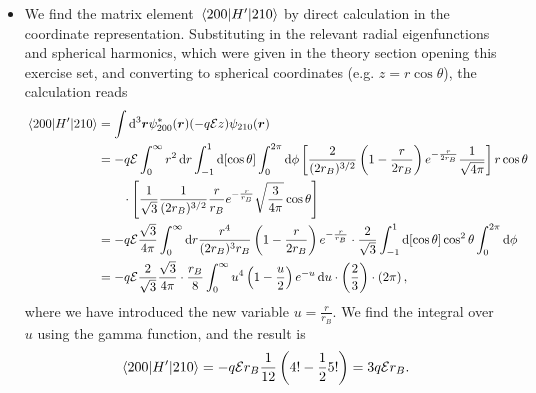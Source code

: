\documentclass[11pt, a4paper]{article}
\newcommand{\diff}{\mathop{}\!\mathrm{d}} %
\renewcommand{\vec}[1]{\bm{#1}} %
\renewcommand{\r}{\vec{r}}  %
\newcommand{\E}{\mathcal{E}}  %
\begin{document}
\begin{itemize}
	\item We find the matrix element $ \mel{200}{H'}{210} $ by direct calculation in the coordinate representation. Substituting in the relevant radial eigenfunctions and spherical harmonics, which were given in the theory section opening this exercise set, and converting to spherical coordinates (e.g. $ z = r\cos \theta $), the calculation reads
	\begin{align*}
		\mel{200}{H'}{210} &= \int \diff^{3}\vec{r} \psi_{200}^{*}(\r) (-q \E z)\psi_{210}(\r)\\
		& = -q\E\int_{0}^{\infty}r^{2} \diff r \int_{-1}^{1}\diff [\cos \theta] \int_{0}^{2\pi}\diff \phi\left[ \frac{2}{(2r_{B})^{3/2}}\left(1 - \frac{r}{2r_{B}}\right)e^{-\frac{r}{2r_{B}}}\frac{1}{\sqrt{4\pi}}\right] r\cos \theta \\
	 	& {} \qquad \cdot \left[\frac{1}{\sqrt{3}}\frac{1}{(2r_{B})^{3/2}} \frac{r}{r_{B}}e^{-\frac{r}{r_{B}}} \sqrt{\frac{3}{4\pi}} \cos \theta\right]\\
		& = - q \E \frac{\sqrt{3}}{4\pi}\int_{0}^{\infty}\diff r \frac{r^{4}}{(2r_{B})^{3} r_{B}}\left(1 - \frac{r}{2r_{B}}\right)e^{-\frac{r}{r_{B}}} \cdot \frac{2}{\sqrt{3}}\int_{-1}^{1}\diff [\cos \theta] \cos^{2}\theta \int_{0}^{2\pi} \diff \phi\\
		& = -q\E \frac{2}{\sqrt{3}}\frac{\sqrt{3}}{4\pi} \cdot \frac{r_{B}}{8} \int_{0}^{\infty} u^{4}\left(1 - \frac{u}{2}\right)e^{-u} \diff u \cdot \left(\frac{2}{3}\right) \cdot \left(2\pi\right),
	\end{align*}
	where we have introduced the new variable $ u = \frac{r}{r_{B}} $. We find the integral over $ u $ using the gamma function, and the result is
	\begin{equation*}
			\mel{200}{H'}{210} = -q\E r_{B}\frac{1}{12}\left(4! - \frac{1}{2}5!\right) = 3q\E r_{B}.
	\end{equation*}
	

\end{itemize}
\end{document}
